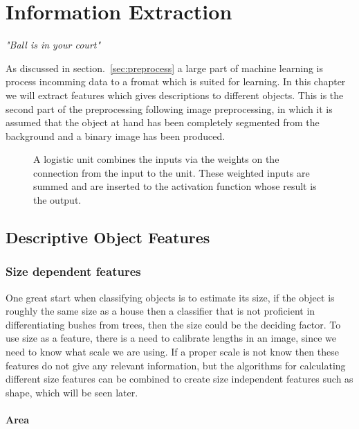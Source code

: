\chapter{Information Extraction}
\begin{center}
\vspace{-6ex}
\textit{"Ball is in your court"}
\vspace{6ex}
\end{center}

As discussed in section.~\ref{sec:preprocess} a large part of machine learning is process incomming data to a fromat which is suited for learning. In this chapter we will extract features which gives descriptions to different objects. This is the second part of the preprocessing following image preprocessing, in which it is assumed that the object at hand has been completely segmented from the background and a binary image has been produced.

\begin{figure}
    \centering
    
    \caption{\label{fig:logistic_unit}A logistic unit combines the inputs via the weights on the connection from the input to the unit. These weighted inputs are summed and are inserted to the activation function whose result is the output.}
\end{figure}

\section{Descriptive Object Features}

\subsection{Size dependent features}

One great start when classifying objects is to estimate its size, if the object is roughly the same size as a house then a classifier that is not proficient in differentiating bushes from trees, then the size could be the deciding factor. To use size as a feature, there is a need to calibrate lengths in an image, since we need to know what scale we are using. If a proper scale is not know then these features do not give any relevant information, but the algorithms for calculating different size features can be combined to create size independent features such as shape, which will be seen later.

\subsubsection{Area}

